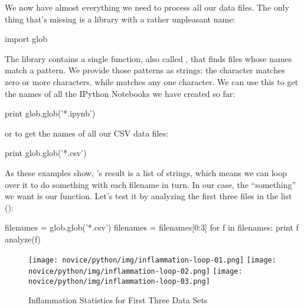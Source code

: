 We now have almost everything we need to process all our data files. The
only thing that's missing is a library with a rather unpleasant name:

\begin{VerbIn}
import glob
\end{VerbIn}

The  library contains a single function, also called
, that finds files whose names match a pattern. We provide
those patterns as strings: the character \code{*} matches zero or more
characters, while  matches any one character. We can use this
to get the names of all the IPython Notebooks we have created so far:

\begin{VerbIn}
print glob.glob('*.ipynb')
\end{VerbIn}

\begin{VerbOut}
\end{VerbOut}

or to get the names of all our CSV data files:

\begin{VerbIn}
print glob.glob('*.csv')
\end{VerbIn}

\begin{VerbOut}
\end{VerbOut}

As these examples show, 's result is a list of
strings, which means we can loop over it to do something with each
filename in turn. In our case, the ``something'' we want is our
 function. Let's test it by analyzing the first three
files in the list ():

\begin{VerbIn}
filenames = glob.glob('*.csv')
filenames = filenames[0:3]
for f in filenames:
    print f
    analyze(f)
\end{VerbIn}

\begin{figure}
\begin{center}
\texttt{[image: novice/python/img/inflammation-loop-01.png]}
\texttt{[image: novice/python/img/inflammation-loop-02.png]}
\texttt{[image: novice/python/img/inflammation-loop-03.png]}
\caption{Inflammation Statistics for First Three Data Sets}\label{f:inflammation-loop}
\end{center}
\end{figure}

